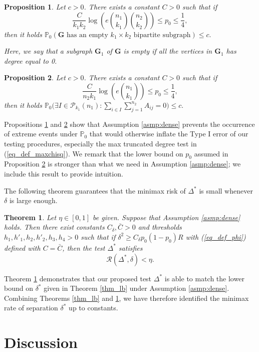 \documentclass{article}
\newcommand{\bG}{\mathbf{G}}
\newcommand{\bbP}{\mathbb{P}}
\newcommand{\cR}{\mathcal{R}}
\newtheorem{theorem}{Theorem}
\newtheorem{proposition}{Proposition}
\begin{document}
\begin{proposition}\label{prop_nonempty_subgraph}
    Let $c > 0$. There exists a constant $C > 0$ such that if
    \[\frac{C}{k_1k_2} \log\left(e{n_1 \choose k_1}{n_2 \choose k_2}\right) \leq p_0 \leq \frac{1}{4},\]
    then it holds
    \(\bbP_0\left(\text{$\bG$ has an empty $k_1 \times k_2$ bipartite subgraph}\right) \leq c.\)
    
    Here, we say that a subgraph $\bG_1$ of $\bG$ is empty if all the vertices in $\bG_1$ has degree equal to 0.
\end{proposition}
\begin{proposition}\label{prop_nonempty_half} 
    Let $c > 0$. There exists a constant $C > 0$ such that if
    \[\frac{C}{n_2k_1} \log\left(e{n_1 \choose k_1}\right) \leq p_0 \leq \frac{1}{4},\]
    then it holds
    \(\bbP_0\Big(\exists I \in \mathcal{P}_{k_1}(n_1): \sum_{i \in I} \sum_{j=1}^{n_2} A_{ij} = 0\Big) \leq c.\)
\end{proposition}

Propositions \ref{prop_nonempty_subgraph} and \ref{prop_nonempty_half} show that Assumption \ref{asmp:dense} prevents the occurrence of extreme events under $\bbP_0$ that would otherwise inflate the Type I error of our testing procedures, especially the max truncated degree test in (\ref{eq_def_maxchisq}). We remark that the lower bound on $p_0$ assumed in Proposition \ref{prop_nonempty_half} is stronger than what we need in Assumption \ref{asmp:dense}; we include this result to provide intuition.

The following theorem guarantees that the minimax risk of $\Delta^*$ is small whenever $\delta$ is large enough.
\begin{theorem}\label{thm_ub}
    Let $\eta \in [0,1]$ be given. Suppose that Assumption \ref{asmp:dense} holds. Then there exist constants $C_\delta, \bar{C} > 0$ and thresholds $h_1, h'_1, h_2, h'_2, h_3, h_4 > 0$ such that if $\delta^2 \geq C_\delta p_0(1- p_0)R$ with (\ref{eq_def_phi}) defined with $C = \bar{C}$, then the test $\Delta^*$ satisfies
    \[\cR(\Delta^*, \delta) < \eta.\]
\end{theorem}
Theorem \ref{thm_ub} demonstrates that our proposed test $\Delta^*$ is able to match the lower bound on $\delta^*$ given in Theorem \ref{thm_lb} under Assumption \ref{asmp:dense}. Combining Theorems \ref{thm_lb} and \ref{thm_ub}, we have therefore identified the minimax rate of separation $\delta^*$ up to constants. 

\section{Discussion}\label{sec_discussion}
\end{document}
